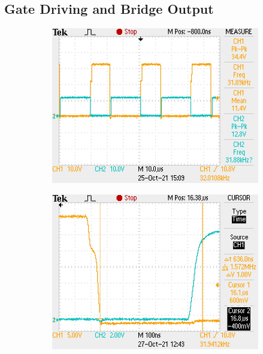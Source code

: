 \documentclass[11pt]{article}
\begin{document}
{\subsection{Gate Driving and Bridge Output}
\begin{figure}[h!]
  \centering
  \begin{subfigure}{0.3\textwidth}
    \includegraphics[width=\columnwidth]{img/testing/power_output/gate_input.JPG}
  \end{subfigure}
  \begin{subfigure}{0.3\textwidth}
    \includegraphics[width=\columnwidth]{img/testing/power_output/dead_time.JPG}
  \end{subfigure}

\end{figure}}
\end{document}
